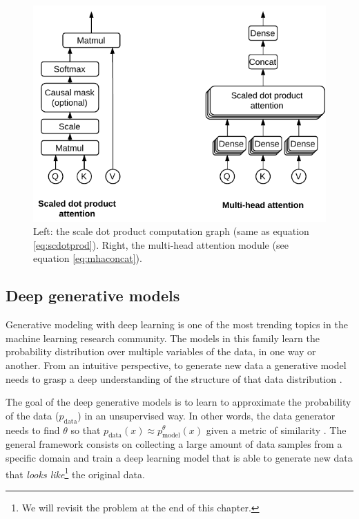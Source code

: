 \begin{figure}
	\centering
	\includegraphics[width=0.85\linewidth]{background/images/attention_modules}
	\caption[Transformer building blocks]{Left: the scale dot product computation graph (same as equation \ref{eq:scdotprod}). Right, the multi-head attention module (see equation \ref{eq:mhaconcat}).}
	\label{fig:attentionmodules}
\end{figure}

\subsection{Deep generative models} \label{sec:generative}
Generative modeling with deep learning is one of the most trending topics in the machine learning research community. The models in this family learn the probability distribution over multiple variables of the data, in one way or another. From an intuitive perspective, to generate new data a generative model needs to grasp a deep understanding of the structure of that data distribution \autocite{Goodfellow2016}.

The goal of the deep generative models is to learn to approximate the probability of the data ($p_\mathrm{data}$) in an unsupervised way. In other words, the data generator needs to find $\theta$ so that $p_\mathrm{data}(x) \approx p_\mathrm{model}^\theta(x)$ given a metric of similarity \autocite{Goodfellow2016}. The general framework consists on collecting a large amount of data samples from a specific domain and train a deep learning model that is able to generate new data that \textit{looks like}\footnote{We will revisit the problem at the end of this chapter.} the original data.

